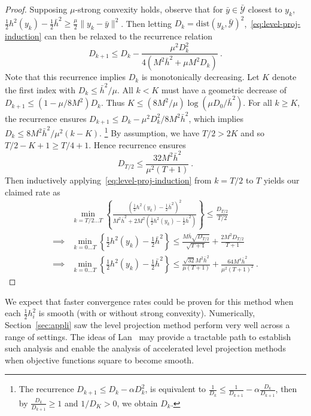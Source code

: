 \documentclass[sn-mathphys,Numbered]{sn-jnl}%
\begin{document}
\begin{appendices}
{\begin{proof}
Supposing $\mu$-strong convexity holds, observe that for $\bar y\in \mathcal{\bar Y}$ closest to $y_k$, $\frac{1}{2}h^2(y_k) - \frac{1}{2}\bar h^2 \geq \frac{\mu}{2}\|y_k-\bar y\|^2$. Then letting $D_k = \mathrm{dist}(y_k, \mathcal{\bar Y})^2$,~\eqref{eq:level-proj-induction} can then be relaxed to the recurrence relation
$$ D_{k+1} \leq D_k - \frac{\mu^2 D_k^2}{4(M^2\bar h^2 + \mu M^2D_k)} \ .$$
Note that this recurrence implies $D_k$ is monotonically decreasing. Let $K$ denote the first index with $D_k \leq \bar h^2/\mu$. All $k<K$ must have a geometric decrease of $D_{k+1}\leq (1-\mu/8M^2 )D_k$. Thus $K\leq (8M^2/\mu) \log(\mu D_0/\bar h^2)$. For all $k\geq K$, the recurrence ensures $D_{k+1}\leq D_k - \mu^2 D_k^2/8M^2\bar h^2$, which implies $D_k \leq 8M^2\bar h^2/\mu^2(k-K)$. \footnote{The recurrence $D_{k+1} \leq D_k - \alpha D_k^2$, is equivalent to $\frac{1}{D_k} \leq \frac{1}{D_{k+1}}-\alpha \frac{D_k}{D_{k+1}}$, then by $\frac{D_k}{D_{k+1}}\geq 1$ and $1/D_K>0$, we obtain $D_k$.}
By assumption, we have $T/2 > 2K$ and so $T/2-K+1 \geq T/4 +1 $. Hence recurrence ensures
$$ D_{T/2} \leq \frac{32 M^2\bar h^2}{\mu^2(T+1)} \ . $$
Then inductively applying~\eqref{eq:level-proj-induction} from $k=T/2$ to $T$ yields our claimed rate as
\begin{align*}
    & \min_{k=T/2\dots T}\left\{\frac{\left(\frac{1}{2}h^2(y_k) - \frac{1}{2}\bar h^2\right)^2}{M^2\bar h^2 + 2M^2\left(\frac{1}{2}h^2(y_k) - \frac{1}{2}\bar h^2\right)}\right\} \leq \frac{D_{T/2}}{T/2} \\
    \implies & \min_{k=0\dots T}\left\{\frac{1}{2}h^2(y_k) - \frac{1}{2}\bar h^2\right\} \leq \frac{M\bar h\sqrt{D_{T/2}}}{\sqrt{T+1}} + \frac{2M^2D_{T/2}}{T+1} \\
    \implies & \min_{k=0\dots T}\left\{\frac{1}{2}h^2(y_k) - \frac{1}{2}\bar h^2\right\} \leq \frac{\sqrt{32}M^2\bar h^2}{\mu (T+1)} + \frac{64M^4\bar h^2}{\mu^2(T+1)^2} \ . 
\end{align*}
\end{proof}
We expect that faster convergence rates could be proven for this method when each $\frac{1}{2}h_i^2$ is smooth (with or without strong convexity). Numerically, Section~\ref{sec:appli} saw the level projection method perform very well across a range of settings. The ideas of Lan~\cite{Lan2015} may provide a tractable path to establish such analysis and enable the analysis of accelerated level projection methods when objective functions square to become smooth.



}
\end{appendices}
\end{document}
